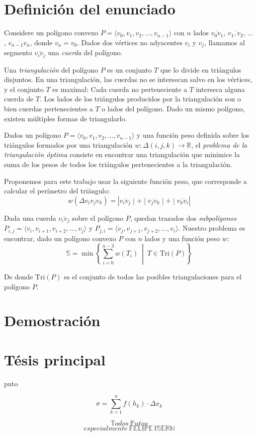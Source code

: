 \documentclass[tiny]{corsage}
\newcommand{\R}{\mathbb{R}}
\newcommand{\Tri}{\text{Tri}}
\newcommand{\segment}[1]{\overline{#1}}
\begin{document}
\section{Definición del enunciado}
	Considere un polígono convexo $P = \langle v_0, v_1, v_2, \dots, v_{n - 1} \rangle$ con $n$ lados $\segment{v_0v_1}$, $\segment{v_1,v_2}$, $\dots$, $\segment{v_{n - 1}v_n}$,  donde $v_n = v_0$.  Dados dos vértices no adyacentes $v_i$ y $v_j$, llamamos al segmento $\segment{v_iv_j}$ una \emph{cuerda} del polígono.

	Una \emph{triangulación} del polígono $P$ es un conjunto $T$ que lo divide en triángulos disjuntos.  En una triangulación, las cuerdas no se intersecan salvo en los vértices, y el conjunto $T$ es maximal:  Cada cuerda no perteneciente a $T$ interseca alguna cuerda de $T$.  Los lados de los triángulos producidos por la triangulación son o bien cuerdas pertenecientes a $T$ o lados del polígono.  Dado un mismo polígono, existen múltiples formas de triangularlo.

	Dados un polígono $P = \langle v_0, v_1, v_2, \dots, v_{n - 1} \rangle$ y una función peso definida sobre los triángulos formados por una triangulación $w: \Delta(i, j, k) \to \R$, el \emph{problema de la triangulación óptima} consiste en encontrar una triangulación que minimice la suma de los pesos de todos los triángulos pertenecientes a la triangulación.

	Proponemos para este trabajo usar la siguiente función peso, que corresponde a calcular el perímetro del triángulo:
	\begin{equation}
		w(\Delta{v_iv_jv_k}) = \left | \segment{v_iv_j} \middle | + \middle | \segment{v_jv_k} \middle | + \middle | \segment{v_kv_i} \right |
		\label{fn-w}
	\end{equation}

	Dada una cuerda $\segment{v_iv_j}$ sobre el polígono $P$, quedan trazados dos \emph{subpolígonos} $P_{i, j} = \langle v_i, v_{i + 1}, v_{i + 2}, \dots, v_j \rangle$ y $P_{j, i} = \langle v_j, v_{j + 1}, v_{j + 2}, \dots, v_i \rangle$.  Nuestro problema es encontrar, dado un polígono convexo $P$ con $n$ lados y una función peso $w$:
	\begin{equation}
		\mathbb{S} = \min{\left \{ \sum_{i = 0}^{n - 3}{w(T_i)} \ \middle | \  T \in \Tri(P) \right \}}
		\label{def-sol}
	\end{equation}

	De donde $\Tri(P)$ es el conjunto de todas las posibles triangulaciones para el polígono $P$.

\section{Demostración}

\section{Tésis principal}
	puto

	\[ \sigma = \sum_{k = 1}^n{f(h_k) \cdot \Delta x_k} \]

	\[ \mathbb{T}odos\ \mathbb{P}utos \] 
	\[especialmente\ \mathbb{FELIPE\ ISERN} \]
\end{document}
